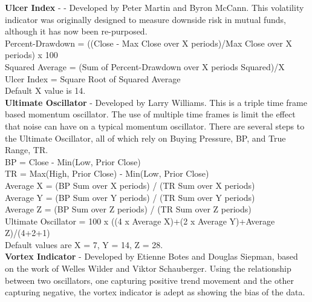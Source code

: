 \documentclass[conference]{IEEEtran}
\begin{document}
\iffalse
[]
\fi

\noindent
\textbf{Ulcer Index} - \cite{Martin1992} - Developed by Peter Martin and Byron McCann. This volatility indicator was originally designed to measure downside risk in mutual funds, although it has now been re-purposed.  \\

\noindent
Percent-Drawdown = ((Close - Max Close over X periods)/Max Close over X periods) x 100\\
Squared Average = (Sum of Percent-Drawdown over X periods Squared)/X\\
Ulcer Index = Square Root of Squared Average\\
Default X value is 14.\\

\iffalse
[]
\fi

\noindent
\textbf{Ultimate Oscillator} - Developed by Larry Williams. This is a triple time frame based momentum oscillator. The use of multiple time frames is limit the effect that noise can have on a typical momentum oscillator. There are several steps to the Ultimate Oscillator, all of which rely on Buying Pressure, BP, and True Range, TR.\\

\noindent
BP = Close - Min(Low, Prior Close)\\
TR = Max(High, Prior Close)  -  Min(Low, Prior Close)\\

\noindent
Average X = (BP Sum over X periods) / (TR Sum over X periods)\\
Average Y = (BP Sum over Y periods) / (TR Sum over Y periods)\\
Average Z = (BP Sum over Z periods) / (TR Sum over Z periods)\\

\noindent
Ultimate Oscillator = 100 x ((4 x Average X)+(2 x Average Y)+Average Z)/(4+2+1)\\
Default values are X = 7, Y = 14, Z = 28.\\

\iffalse
[]
\fi

\noindent
\textbf{Vortex Indicator} - Developed by Etienne Botes and Douglas Siepman, based on the work of Welles Wilder and Viktor Schauberger. Using the relationship between two oscillators, one capturing positive trend movement and the other capturing negative, the vortex indicator is adept as showing the bias of the data.\\
\end{document}
